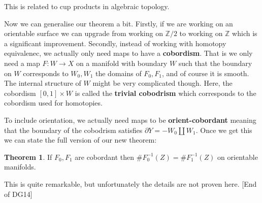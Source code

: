 \documentclass{article}
\theoremstyle{definition}
\newtheorem{theorem}{Theorem}
\begin{document}
This is related to cup products in algebraic topology.

Now we can generalise our theorem a bit. Firstly, if we are working on an
orientable surface we can upgrade from working on $\mathbb{Z} / 2$ to working on
$\mathbb{Z}$ which is a significant improvement. Secondly, instead of working
with homotopy equivalenec, we actually only need maps to have a \textbf{cobordism}. That
is we only need a map $F : W \to X$ on a manifold with boundary $W$ such that
the boundary on $W$ corresponds to $W_0, W_1$ the domains of $F_0, F_1$, and of
course it is smooth. The internal structure of $W$ might be very complicated
though. Here, the cobordism $[0, 1] \times W$ is called the \textbf{trivial
  cobodrism} which corresponds to the cobordism used for homotopies.

To include orientation, we actually need maps to be \textbf{orient-cobordant}
meaning that the boundary of the cobodrism satisfies $\partial Y = -W_0 \coprod
W_1$. Once we get this we can state the full version of our new theorem:

\begin{theorem}
  If $F_0, F_1$ are cobordant then $\#F_0^{-1}(Z) = \#F_1^{-1}(Z)$ on orientable manifolds.
\end{theorem}

This is quite remarkable, but unfortunately the details are not proven here.
[End of DG14]
\end{document}
